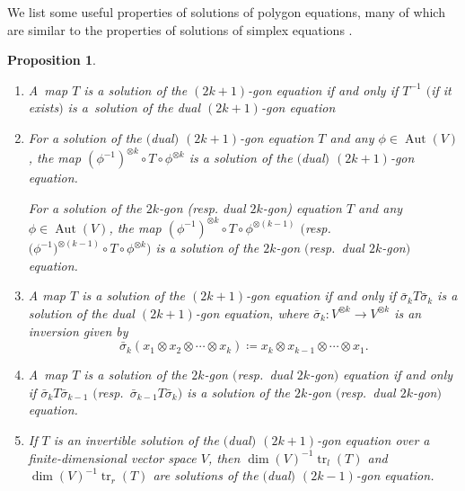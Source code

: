 \documentclass[pdftex]{sigma}
\numberwithin{equation}{section}
\newtheorem{Proposition}[Theorem]{Proposition}
\theoremstyle{definition}
\begin{document}
We list some useful properties of solutions of polygon equations, many of which are similar to the properties of solutions of simplex equations \cite{bardakov2024set}.
\begin{Proposition}\label{prop:usefulpolygon}\quad
 \begin{enumerate}\itemsep=0pt
 \item[$(1)$] A~map $T$ is a solution of the $(2k+1)$-gon equation if and only if $T^{-1}$ $($if it exists$)$ is a~solution of the dual $(2k+1)$-gon equation
 \item[$(2)$] For a solution of the $($dual$)$ $(2k+1)$-gon equation $T$ and any $\phi\in\operatorname{Aut}(V)$, the map $(\phi^{-1})^{\otimes k}\circ T\circ\phi^{\otimes k}$ is a solution of the $($dual$)$ $(2k+1)$-gon equation.

 For a solution of the $2k$-gon (resp. dual $2k$-gon) equation $T$ and any $\phi\in\operatorname{Aut}(V)$, the map $(\phi^{-1})^{\otimes k}\circ T\circ\phi^{\otimes (k-1)}$ $($resp.\ $\bigl(\phi^{-1}\bigr)^{\otimes (k-1)}\circ T\circ\phi^{\otimes k})$ is a solution of the $2k$-gon $($resp.\ dual $2k$-gon$)$ equation.
 \item[$(3)$] A map $T$ is a solution of the $(2k+1)$-gon equation if and only if $\bar{\sigma}_k T\bar{\sigma}_k $ is a solution of the dual $(2k+1)$-gon equation, where $\bar{\sigma}_k\colon V^{\otimes k}\to V^{\otimes k}$ is an inversion given by
 \begin{equation}\label{eq:inversion}
 \bar{\sigma}_k(x_1\otimes x_2\otimes\cdots\otimes x_k) \coloneqq x_k\otimes x_{k-1}\otimes \cdots\otimes x_1.
 \end{equation}
 \item[$(4)$] A~map $T$ is a solution of the $2k$-gon $($resp.\ dual $2k$-gon$)$ equation if and only if $\bar{\sigma}_{k}T\bar{\sigma}_{k-1}$ $($resp.\ $\bar{\sigma}_{k-1}T\bar{\sigma}_{k})$ is a solution of the $2k$-gon $($resp.\ dual $2k$-gon$)$ equation.

 \item[$(5)$] If $T$ is an invertible solution of the $($dual$)$ $(2k+1)$-gon equation over a finite-dimensional vector space $V$, then $\dim(V)^{-1}\operatorname{tr}_l(T)$ and $\dim(V)^{-1}\operatorname{tr}_r(T)$ are solutions of the $($dual$)$ $(2k-1)$-gon equation.%
 \end{enumerate}
\end{Proposition}
\end{document}
